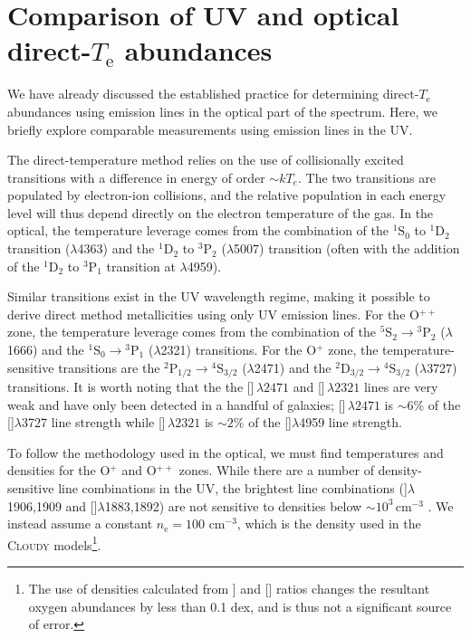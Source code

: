 \documentclass[preprint2]{aastex62}
\newcommand{\Cloudy}{\textsc{Cloudy}\xspace}
\newcommand{\oiii}{[\ion{O}{3}]}
\newcommand{\oii}{[\ion{O}{2}]}
\newcommand{\SiuIII}{[\ion{Si}{3}]}
\newcommand{\ciii}{\ion{C}{3}]}
\newcommand{\Te}{\ensuremath{T_{\mathrm{e}}}\xspace}
\begin{document}
\section{Comparison of UV and optical direct-\Te abundances}\label{appdx:UVdirectTe}

We have already discussed the established practice for determining direct-\Te abundances using emission lines in the optical part of the spectrum. Here, we briefly explore comparable measurements using emission lines in the UV.

The direct-temperature method relies on the use of collisionally excited transitions with a difference in energy of order ${\sim}k T_{e}$. The two transitions are populated by electron-ion collisions, and the relative population in each energy level will thus depend directly on the electron temperature of the gas. In the optical, the temperature leverage comes from the combination of the ${}^1 \mathrm{S}_0$ to ${}^1 \mathrm{D}_2$ transition ($\lambda$4363) and the  ${}^1 \mathrm{D}_2$ to ${}^3 \mathrm{P}_2$ ($\lambda$5007) transition (often with the addition of the ${}^1\mathrm{D}_2$ to $^3\mathrm{P}_1$ transition at $\lambda$4959).

Similar transitions exist in the UV wavelength regime, making it possible to derive direct method metallicities using only UV emission lines. For the O$^{++}$ zone, the temperature leverage comes from the combination of the ${}^5 \mathrm{S}_2 \rightarrow {}^3 \mathrm{P}_2$ ($\lambda$1666) and the ${}^1 \mathrm{S}_0 \rightarrow {}^3 \mathrm{P}_1$ ($\lambda$2321) transitions. For the O$^{+}$ zone, the temperature-sensitive transitions are the ${}^2 \mathrm{P}_{1/2} \rightarrow {}^4 \mathrm{S}_{3/2}$ ($\lambda$2471) and the ${}^2 \mathrm{D}_{3/2} \rightarrow {}^4 \mathrm{S}_{3/2}$ ($\lambda$3727) transitions. It is worth noting that the the \oii$\,\lambda2471$ and \oiii$\,\lambda2321$ lines are very weak and have only been detected in a handful of galaxies; \oii$\,\lambda2471$ is ${\sim}6$\% of the \oii$\lambda$3727 line strength while \oiii$\,\lambda2321$ is ${\sim}2$\% of the \oiii$\lambda$4959 line strength.

To follow the methodology used in the optical, we must find temperatures and densities for the O$^{+}$ and O$^{++}$ zones. While there are a number of density-sensitive line combinations in the UV, the brightest line combinations (\ciii$\lambda$1906,1909 and \SiuIII$\lambda$1883,1892) are not sensitive to densities below $\sim10^3\,$cm$^{-3}$ \citep{Berg+2019}. We instead assume a constant $n_{\mathrm{e}} = 100$ cm$^{-3}$, which is the density used in the \Cloudy models\footnote{The use of densities calculated from \ciii{} and \SiuIII{} ratios changes the resultant oxygen abundances by less than 0.1 dex, and is thus not a significant source of error.}.
\end{document}
